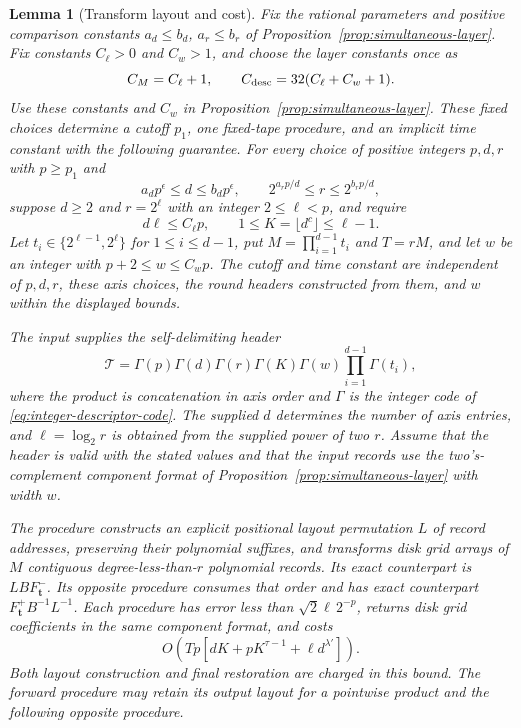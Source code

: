 \documentclass[11pt]{article}
\newtheorem{lemma}[theorem]{Lemma}
\theoremstyle{definition}
\begin{document}
\begin{lemma}[Transform layout and cost]
\label{lem:synthetic-transform-cost}
Fix the rational parameters and positive comparison constants
$a_d\leq b_d$, $a_r\leq b_r$ of
Proposition~\ref{prop:simultaneous-layer}. Fix constants $C_\ell>0$
and $C_w>1$, and choose the layer constants once as
\[
 C_M=C_\ell+1,\qquad
 C_{\rm desc}=32(C_\ell+C_w+1).
\]
Use these constants and $C_w$ in
Proposition~\ref{prop:simultaneous-layer}. These fixed choices determine
a cutoff $p_1$, one fixed-tape procedure, and an implicit time constant
with the following guarantee. For every choice of positive integers
$p,d,r$ with $p\geq p_1$ and
\[
 a_dp^\epsilon\leq d\leq b_dp^\epsilon,\qquad
 2^{a_rp/d}\leq r\leq2^{b_rp/d},
\]
suppose $d\geq2$ and $r=2^\ell$ with an integer $2\leq\ell<p$, and require
\[
 d\ell\leq C_\ell p,\qquad
 1\leq K=\lfloor d^c\rfloor\leq\ell-1.
\]
Let
$t_i\in\{2^{\ell-1},2^\ell\}$ for $1\leq i\leq d-1$, put
$M=\prod_{i=1}^{d-1}t_i$ and $T=rM$, and let $w$ be an integer with
$p+2\leq w\leq C_wp$. The cutoff and time constant are independent of
$p,d,r$, these axis choices, the round headers constructed from them,
and $w$ within the displayed bounds.

The input supplies the self-delimiting header
\[
 \mathcal T=\Gamma(p)\Gamma(d)\Gamma(r)\Gamma(K)\Gamma(w)
       \prod_{i=1}^{d-1}\Gamma(t_i),
\]
where the product is concatenation in axis order and $\Gamma$ is the
integer code of \eqref{eq:integer-descriptor-code}.
The supplied $d$ determines the number of axis entries, and
$\ell=\log_2r$ is obtained from the supplied power of two $r$.
Assume that the header is valid with the stated values and that the
input records use the two's-complement component format of
Proposition~\ref{prop:simultaneous-layer} with width $w$.

The procedure constructs an explicit positional
layout permutation $L$ of record addresses, preserving their polynomial
suffixes, and transforms disk grid arrays of $M$ contiguous
degree-less-than-$r$ polynomial records. Its exact counterpart is
$LB F_{\boldsymbol t}^-$.  Its opposite procedure consumes
that order and has exact counterpart
$F_{\boldsymbol t}^+B^{-1}L^{-1}$.  Each procedure has error less than
$\sqrt2\ell\,2^{-p}$, returns disk grid coefficients in the same
component format, and costs
\begin{equation}
 O\left(Tp\left[dK+pK^{\tau-1}+\ell d^{\lambda'}\right]\right).
 \label{eq:synthetic-transform-cost}
\end{equation}
Both layout construction and final restoration are charged in this
bound.  The forward procedure may retain its output layout for a
pointwise product and the following opposite procedure.
\end{lemma}
\end{document}
